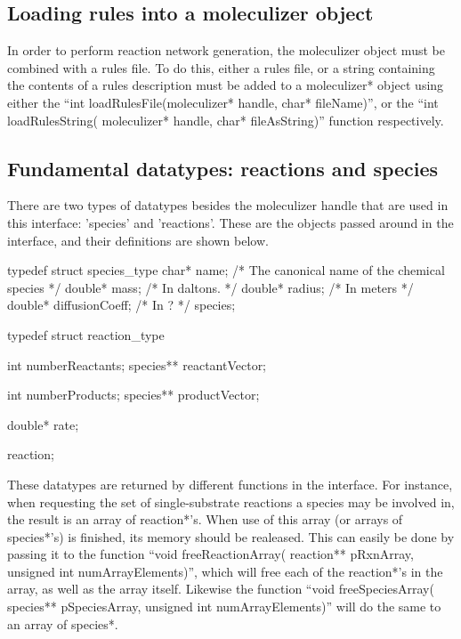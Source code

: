 \subsection{Loading rules into a moleculizer object}
In order to perform reaction network generation, the moleculizer
object must be combined with a rules file.  To do this, either a rules
file, or a string containing the contents of a rules description must
be added to a moleculizer* object using either the ``int
loadRulesFile(moleculizer* handle, char* fileName)'', or the ``int
loadRulesString( moleculizer* handle, char* fileAsString)'' function
respectively.  

\subsection{Fundamental datatypes: reactions and species}
There are two types of datatypes besides the moleculizer handle that are used
in this interface: 'species' and 'reactions'.  These are the objects
passed around in the interface, and their definitions are shown below.

\begin{ExampleC}[caption=Fundamental data-type definitions,
  label=speciesreactiondef]

  typedef struct species_type
    {
      char* name; /* The canonical name of the chemical species */
      double* mass;  /* In daltons. */
      double* radius; /* In meters */ 
      double* diffusionCoeff; /* In ? */
    } species;
    
    typedef struct reaction_type
    {
        int numberReactants;
        species** reactantVector;
        
        int numberProducts;
        species** productVector;
        
        double* rate;
        
    } reaction;

\end{ExampleC}

These datatypes are returned by different functions in the interface.
For instance, when requesting the set of single-substrate reactions a
species may be involved in, the result is an array of reaction*'s.
When use of this array (or arrays of species*'s) is finished, its
memory should be realeased.  This can easily be done by passing it to
the function ``void freeReactionArray( reaction** pRxnArray, unsigned
int numArrayElements)'', which will free each of the reaction*'s in the
array, as well as the array itself.  Likewise the function ``void
freeSpeciesArray( species** pSpeciesArray, unsigned int
numArrayElements)'' will do the same to an array of species*.


